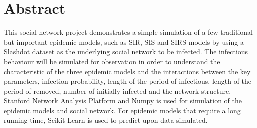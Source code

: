 \documentclass{subfile}
\begin{document}
  \section{Abstract}
  This social network project demonstrates a simple simulation of a few traditional but important epidemic models, such as SIR, SIS and SIRS models by using a Slashdot dataset as the underlying social network to be infected. The infectious behaviour will be simulated for observation in order to understand the characteristic of the three epidemic models and the interactions between the key parameters, infection probability, length of the period of infectious, length of the period of removed, number of initially infected and the network structure. Stanford Network Analysis Platform and Numpy is used for simulation of the epidemic models and social network. For epidemic models that require a long running time, Scikit-Learn is used to predict upon data simulated.
\end{document}

